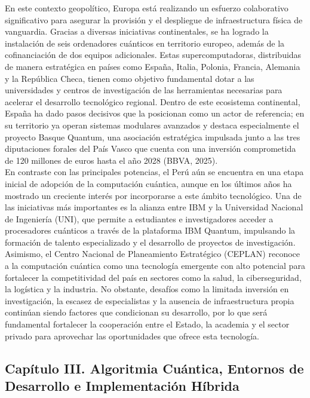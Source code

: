 \documentclass[12pt,a4paper]{article}
\begin{document}
En este contexto geopolítico, Europa está realizando un esfuerzo colaborativo significativo para asegurar la provisión y el despliegue de infraestructura física de vanguardia. Gracias a diversas iniciativas continentales, se ha logrado la instalación de seis ordenadores cuánticos en territorio europeo, además de la cofinanciación de dos equipos adicionales. Estas supercomputadoras, distribuidas de manera estratégica en países como España, Italia, Polonia, Francia, Alemania y la República Checa, tienen como objetivo fundamental dotar a las universidades y centros de investigación de las herramientas necesarias para acelerar el desarrollo tecnológico regional. Dentro de este ecosistema continental, España ha dado pasos decisivos que la posicionan como un actor de referencia; en su territorio ya operan sistemas modulares avanzados y destaca especialmente el proyecto Basque Quantum, una asociación estratégica impulsada junto a las tres diputaciones forales del País Vasco que cuenta con una inversión comprometida de 120 millones de euros hasta el año 2028 (BBVA, 2025).\\

En contraste con las principales potencias, el Perú aún se encuentra en una etapa inicial de adopción de la computación cuántica, aunque en los últimos años ha mostrado un creciente interés por incorporarse a este ámbito tecnológico. Una de las iniciativas más importantes es la alianza entre IBM y la Universidad Nacional de Ingeniería (UNI), que permite a estudiantes e investigadores acceder a procesadores cuánticos a través de la plataforma IBM Quantum, impulsando la formación de talento especializado y el desarrollo de proyectos de investigación. Asimismo, el Centro Nacional de Planeamiento Estratégico (CEPLAN) reconoce a la computación cuántica como una tecnología emergente con alto potencial para fortalecer la competitividad del país en sectores como la salud, la ciberseguridad, la logística y la industria. No obstante, desafíos como la limitada inversión en investigación, la escasez de especialistas y la ausencia de infraestructura propia continúan siendo factores que condicionan su desarrollo, por lo que será fundamental fortalecer la cooperación entre el Estado, la academia y el sector privado para aprovechar las oportunidades que ofrece esta tecnología.\\

\subsection{Capítulo III. Algoritmia Cuántica, Entornos de Desarrollo e Implementación Híbrida}
\end{document}
